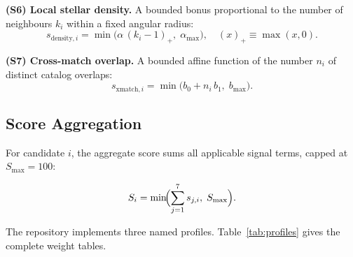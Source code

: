 \documentclass[preprint,12pt,authoryear]{elsarticle}
\begin{document}
\medskip\noindent\textbf{(S6) Local stellar density.} A bounded bonus proportional to the number of neighbours $k_i$ within a fixed angular radius:
\[
s_{\mathrm{density},i} = \min\!\bigl(\alpha\,(k_i - 1)_+,\; \alpha_{\max}\bigr),
\quad (x)_+ \equiv \max(x, 0).
\]

\medskip\noindent\textbf{(S7) Cross-match overlap.} A bounded affine function of the number $n_i$ of distinct catalog overlaps:
\[
s_{\mathrm{xmatch},i} = \min\!\bigl(b_0 + n_i\,b_1,\; b_{\max}\bigr).
\]

\subsection{Score Aggregation}
\label{sec:score_agg}

For candidate $i$, the aggregate score sums all applicable signal terms, capped at $S_{\max}=100$:

\begin{equation}
S_i = \min\!\Bigl(\sum_{j=1}^{7} s_{j,i},\; S_{\max}\Bigr).
\label{eq:score}
\end{equation}

The repository implements three named profiles. Table~\ref{tab:profiles} gives the complete weight tables.
\end{document}
